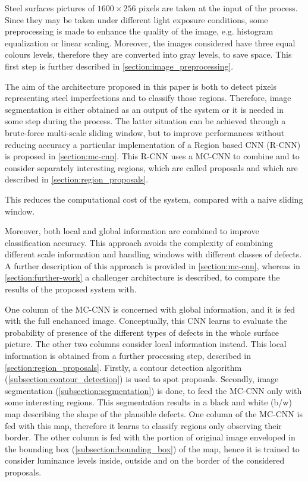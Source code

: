     \par{
        Steel surfaces pictures of $1600\times 256$ pixels are taken at the input of the process. Since they may be taken under different light exposure conditions, some preprocessing is made to enhance the quality of the image, e.g. histogram equalization or linear scaling. Moreover, the images considered have three equal colours levels, therefore they are converted into gray levels, to save space. This first step is further described in \ref{section:image_preprocessing}.
    }
    \par{
        The aim of the architecture proposed in this paper is both to detect pixels representing steel imperfections and to classify those regions. Therefore, image segmentation is either obtained as an output of the system or it is needed in some step during the process. The latter situation can be achieved through a brute-force multi-scale sliding window, but to improve performances without reducing accuracy a particular implementation of a Region based CNN (R-CNN) \cite{ieee:7410526,ieee:7532516} is proposed in \ref{section:mc-cnn}. This R-CNN uses a MC-CNN to combine and to consider separately interesting regions, which are called proposals and which are described in \ref{section:region_proposals}.
    }
    \par{
        This reduces the computational cost of the system, compared with a naive sliding window.
    }
    \par{
        Moreover, both local and global information are combined to improve classification accuracy. This approach avoids the complexity of combining different scale information and handling windows with different classes of defects. A further description of this approach is provided in \ref{section:mc-cnn}, whereas in \ref{section:further-work} a challenger architecture is described, to compare the results of the proposed system with.
    }
    \par{
        One column of the MC-CNN is concerned with global information, and it is fed with the full enchanced image. Conceptually, this CNN learns to evaluate the probability of presence of the different types of defects in the whole surface picture. The other two columns consider local information instead. This local information is obtained from a further processing step, described in \ref{section:region_proposals}. Firstly, a contour detection algorithm (\ref{subsection:contour_detection}) is used to spot proposals. Secondly, image segmentation (\ref{subsection:segmentation}) is done, to feed the MC-CNN only with some interesting regions. This segmentation results in a black and white (b/w) map describing the shape of the plausible defects. One column of the MC-CNN is fed with this map, therefore it learns to classify regions only observing their border. The other column is fed with the portion of original image enveloped in the bounding box (\ref{subsection:bounding_box}) of the map, hence it is trained to consider luminance levels inside, outside and on the border of the considered proposals.
    }
